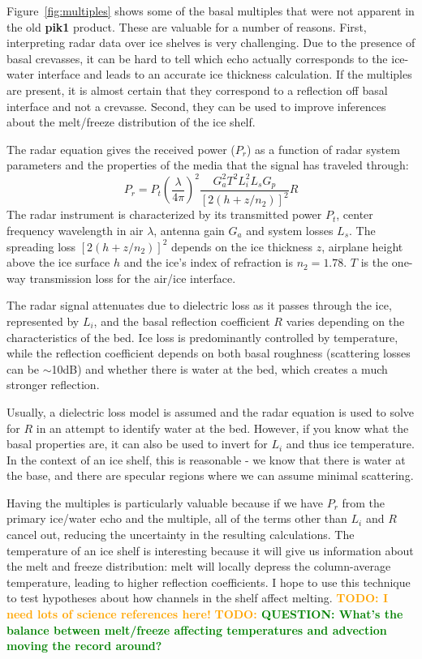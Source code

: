 \documentclass[11pt]{article}
\newcommand{\future}[1]{\ifthenelse{\boolean{include-future}} {\textcolor{Orange}{\textbf{TODO: #1}}}{}}
\newcommand{\question}[1]{\ifthenelse{\boolean{include-questions}} {\textcolor{Green}{\textbf{QUESTION: #1}}}{}}
\newcommand{\figref}[1]{Figure~\ref{#1}}
\begin{document}
\figref{fig:multiples} shows some of the basal multiples that were not apparent in the old \textbf{pik1} product. These are valuable for a number of reasons. First, interpreting radar data over ice shelves is very challenging. Due to the presence of basal crevasses, it can be hard to tell which echo actually corresponds to the ice-water interface and leads to an accurate ice thickness calculation. If the multiples are present, it is almost certain that they correspond to a reflection off basal interface and not a crevasse. Second, they can be used to improve inferences about the melt/freeze distribution of the ice shelf.

The radar equation gives the received power ($P_r$) as a function of radar system parameters and the properties of the media that the signal has traveled through:
\begin{equation}
P_r = P_t \left(\frac{\lambda}{4\pi}\right)^2 \frac{G_a^2 T^2 L_i^2 L_s G_p}{\left[2\left(h+z/n_2 \right) \right]^2}R
\end{equation}
The radar instrument is characterized by its transmitted power $P_t$, center frequency wavelength in air $\lambda$, antenna gain $G_a$ and system losses $L_s$. The spreading loss $\left[2\left(h+z/n_2 \right) \right]^2$ depends on the ice thickness $z$, airplane height above the ice surface $h$ and the ice's index of refraction is $n_2=1.78$. $T$ is the one-way transmission loss for the air/ice interface. 

The radar signal attenuates due to dielectric loss as it passes through the ice, represented by $L_i$, and the basal reflection coefficient $R$ varies depending on the characteristics of the bed. Ice loss is predominantly controlled by temperature, while the reflection coefficient depends on both basal roughness (scattering losses can be $\sim$10dB) and whether there is water at the bed, which creates a much stronger reflection.

Usually, a dielectric loss model is assumed and the radar equation is used to solve for $R$ in an attempt to identify water at the bed. However, if you know what the basal properties are, it can also be used to invert for $L_i$ and thus ice temperature. 
In the context of an ice shelf, this is reasonable - we know that there is water at the base, and there are specular regions where we can assume minimal scattering. 

Having the multiples is particularly valuable because if we have $P_r$ from the primary ice/water echo and the multiple, all of the terms other than $L_i$ and $R$ cancel out, reducing the uncertainty in the resulting calculations. 
The temperature of an ice shelf is interesting because it will give us information about the melt and freeze distribution: melt will locally depress the column-average temperature, leading to higher reflection coefficients. I hope to use this technique to test hypotheses about how channels in the shelf affect melting.
\future{I need lots of science references here!}
\future{\question{What's the balance between melt/freeze affecting temperatures and advection moving the record around?}}
\end{document}
